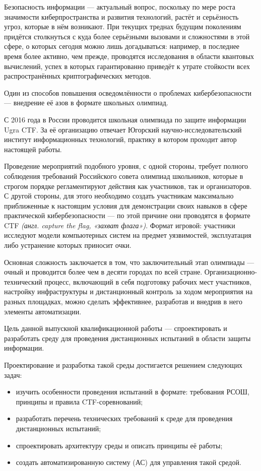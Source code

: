 \Introduction
Безопасность информации — актуальный вопрос, поскольку по мере роста значимости киберпространства и развития технологий, растёт и серьёзность угроз, которые в нём возникают. При текущих треднах будущим поколениям придётся столкнуться с куда более серьёзными вызовами и сложностями в этой сфере, о которых сегодня можно лишь догадываться: например, в последнее время более активно, чем прежде, проводятся исследования в области квантовых вычислений\cite{Quantum1}\cite{Quantum2}, успех в которых гарантированно приведёт к утрате стойкости всех распространённых криптографических методов\cite{Quantum3}.

Один из способов повышения осведомлённости о проблемах кибербезопасности — внедрение её азов в формате школьных олимпиад.

С 2016 года в России проводится школьная олимпиада по защите информации Ugra CTF\cite{UgraHistory}. За её организацию отвечает Югорский научно-исследовательский институт информационных технологий, практику в котором проходит автор настоящей работы.

Проведение мероприятий подобного уровня, с одной стороны, требует полного соблюдения требований Российского совета олимпиад школьников\cite{Rosolymp}, которые в строгом порядке регламентируют действия как участников, так и организаторов. С другой стороны, для этого необходимо создать участникам максимально приближенные к настоящим условия для демонстрации своих навыков в сфере практической кибербезопасности — по этой причине они проводятся в формате CTF \textit{(англ. capture the flag, «захват флага»)}. Формат игровой: участники исследуют модели компьютерных систем на предмет уязвимостей, эксплуатация либо устранение которых приносит очки.

Основная сложность заключается в том, что заключительный этап олимпиады --- очный и проводится более чем в десяти городах по всей стране\cite{Statforma}. Организационно-технический процесс, включающий в себя подготовку рабочих мест участников, настройку инфраструктуры и дистанционный контроль за ходом мероприятия на разных площадках, можно сделать эффективнее, разработав и внедрив в него элементы автоматизации.

Цель данной выпускной квалификационной работы --- спроектировать и разработать среду для проведения дистанционных испытаний в области защиты информации.

Проектирование и разработка такой среды достигается решением следующих задач:
\begin{itemize}
\item изучить особенности проведения испытаний в формате: требования РСОШ, принципы и правила CTF-соревнований;
\item разработать перечень технических требований к среде для проведения дистанционных испытаний;
\item спроектировать архитектуру среды и описать принципы её работы;
\item создать автоматизированную систему (АС) для управления такой средой.
\end{itemize}
